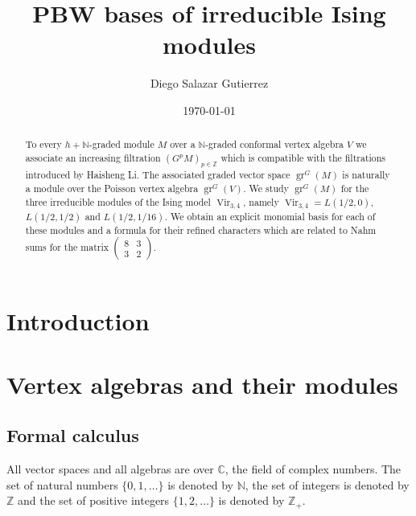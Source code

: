 \documentclass[a4paper, 12pt, reqno]{amsart}
\theoremstyle{remark}
\numberwithin{equation}{subsection}
\DeclareMathOperator{\Vir}{Vir}
\DeclareMathOperator{\gr}{gr}
\begin{document}
\begin{abstract}
  To every $h + \mathbb{N}$-graded module $M$ over a $\mathbb{N}$-graded conformal vertex algebra $V$ we associate an increasing filtration $(G^pM)_{p \in \mathbb{Z}}$ which is compatible with the filtrations introduced by Haisheng Li.
  The associated graded vector space $\gr^G(M)$ is naturally a module over the Poisson vertex algebra $\gr^G(V)$.
  We study $\gr^G(M)$ for the three irreducible modules of the Ising model $\Vir_{3, 4}$, namely $\Vir_{3,4} = L(1/2, 0)$, $L(1/2, 1/2)$ and $L(1/2, 1/16)$.
  We obtain an explicit monomial basis for each of these modules and a formula for their refined characters which are related to Nahm sums for the matrix $\left(\begin{smallmatrix} 8 & 3 \\ 3 & 2 \end{smallmatrix}\right)$.
\end{abstract}

\title{PBW bases of irreducible Ising modules}
\author{Diego Salazar Gutierrez}
\address{Instituto de Matemática Pura e Aplicada, Rio de Janeiro, RJ, Brazil}
\date{\today}
\maketitle

\tableofcontents

\section{Introduction}
\label{sec:introduction}

\section{Vertex algebras and their modules}
\label{sec:vert-algebr-their}

\subsection{Formal calculus}
\label{sec:formal-calculus}

All vector spaces and all algebras are over $\mathbb{C}$, the field of complex numbers.
The set of natural numbers $\{0, 1, \dots\}$ is denoted by $\mathbb{N}$, the set of integers is denoted by $\mathbb{Z}$ and the set of positive integers $\{1, 2, \dots\}$ is denoted by $\mathbb{Z}_+$.
\end{document}
